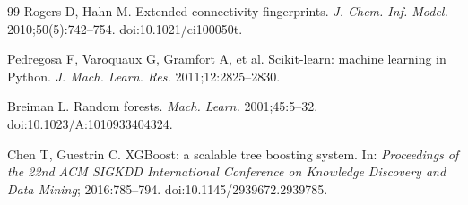 \begin{thebibliography}{99}
Rogers D, Hahn M. Extended-connectivity fingerprints. \textit{J. Chem. Inf. Model.} 2010;50(5):742--754. doi:10.1021/ci100050t.

Pedregosa F, Varoquaux G, Gramfort A, et al. Scikit-learn: machine learning in Python. \textit{J. Mach. Learn. Res.} 2011;12:2825--2830.

Breiman L. Random forests. \textit{Mach. Learn.} 2001;45:5--32. doi:10.1023/A:1010933404324.

Chen T, Guestrin C. XGBoost: a scalable tree boosting system. In: \textit{Proceedings of the 22nd ACM SIGKDD International Conference on Knowledge Discovery and Data Mining}; 2016:785--794. doi:10.1145/2939672.2939785.

\end{thebibliography}
